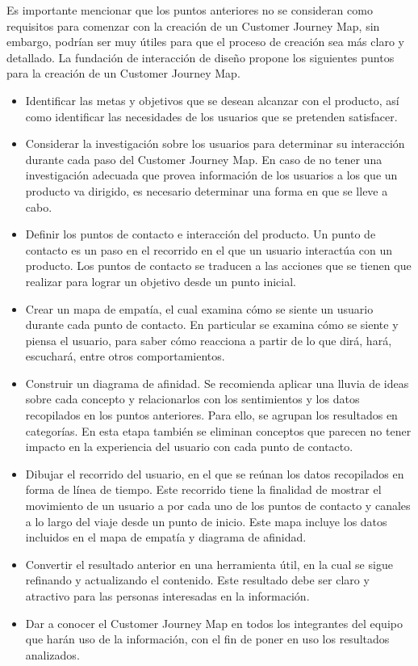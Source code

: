 Es importante mencionar que los puntos anteriores no se consideran como requisitos para comenzar con la creación de un Customer Journey Map, sin embargo, podrían ser muy útiles para que el proceso de creación sea más claro y detallado. La fundación de interacción de diseño propone los siguientes puntos para la creación de un Customer Journey Map.

\begin{itemize}
  \item Identificar las metas y objetivos que se desean alcanzar con el producto, así como identificar las necesidades de los usuarios que se pretenden satisfacer.
  \item Considerar la investigación sobre los usuarios para determinar su interacción durante cada paso del Customer Journey Map. En caso de no tener una investigación adecuada que provea información de los usuarios a los que un producto va dirigido, es necesario determinar una forma en que se lleve a cabo.
  \item Definir los puntos de contacto e interacción del producto. Un punto de contacto es un paso en el recorrido en el que un usuario interactúa con un producto. Los puntos de contacto se traducen a las acciones que se tienen que realizar para lograr un objetivo desde un punto inicial.
  \item Crear un mapa de empatía, el cual examina cómo se siente un usuario durante cada punto de contacto. En particular se examina cómo se siente y piensa el usuario, para saber cómo reacciona a partir de lo que dirá, hará, escuchará, entre otros comportamientos.
  \item Construir un diagrama de afinidad. Se recomienda aplicar una lluvia de ideas sobre cada concepto y relacionarlos con los sentimientos y los datos recopilados en los puntos anteriores. Para ello, se agrupan los resultados en categorías. En esta etapa también se eliminan conceptos que parecen no tener impacto en la experiencia del usuario con cada punto de contacto.
  \item Dibujar el recorrido del usuario, en el que se reúnan los datos recopilados en forma de línea de tiempo. Este recorrido tiene la finalidad de mostrar el movimiento de un usuario a por cada uno de los puntos de contacto y canales a lo largo del viaje desde un punto de inicio. Este mapa incluye los datos incluidos en el mapa de empatía y diagrama de afinidad.
  \item Convertir el resultado anterior en una herramienta útil, en la cual se sigue refinando y actualizando el contenido. Este resultado debe ser claro y atractivo para las personas interesadas en la información.
  \item Dar a conocer el Customer Journey Map en todos los integrantes del equipo que harán uso de la información, con el fin de poner en uso los resultados analizados.
\end{itemize}

